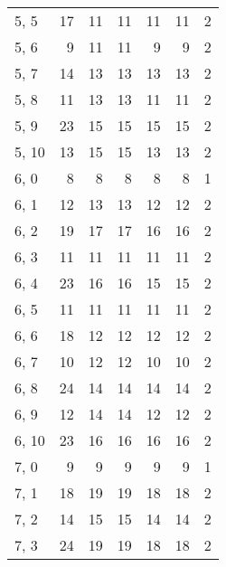 \begin{table}
\begin{tabular}{lrrrrrr}
5, 5   &          17 &           11 &         11 &           11 &        11 &      2 \\
5, 6   &           9 &           11 &         11 &            9 &         9 &      2 \\
5, 7   &          14 &           13 &         13 &           13 &        13 &      2 \\
5, 8   &          11 &           13 &         13 &           11 &        11 &      2 \\
5, 9   &          23 &           15 &         15 &           15 &        15 &      2 \\
5, 10  &          13 &           15 &         15 &           13 &        13 &      2 \\
6, 0   &           8 &            8 &          8 &            8 &         8 &      1 \\
6, 1   &          12 &           13 &         13 &           12 &        12 &      2 \\
6, 2   &          19 &           17 &         17 &           16 &        16 &      2 \\
6, 3   &          11 &           11 &         11 &           11 &        11 &      2 \\
6, 4   &          23 &           16 &         16 &           15 &        15 &      2 \\
6, 5   &          11 &           11 &         11 &           11 &        11 &      2 \\
6, 6   &          18 &           12 &         12 &           12 &        12 &      2 \\
6, 7   &          10 &           12 &         12 &           10 &        10 &      2 \\
6, 8   &          24 &           14 &         14 &           14 &        14 &      2 \\
6, 9   &          12 &           14 &         14 &           12 &        12 &      2 \\
6, 10  &          23 &           16 &         16 &           16 &        16 &      2 \\
7, 0   &           9 &            9 &          9 &            9 &         9 &      1 \\
7, 1   &          18 &           19 &         19 &           18 &        18 &      2 \\
7, 2   &          14 &           15 &         15 &           14 &        14 &      2 \\
7, 3   &          24 &           19 &         19 &           18 &        18 &      2 \\

\end{tabular}
\end{table}

